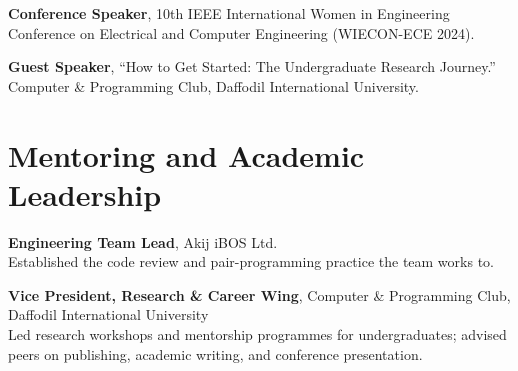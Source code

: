 \documentclass[a4paper,11pt]{article}
\let\origsection\section
\renewcommand{\section}[1]{\needspace{7\baselineskip}\origsection{#1}}
\newenvironment{datedlist}
  {\begin{list}{}{%
     \setlength{\leftmargin}{3.3cm}\setlength{\labelwidth}{2.9cm}
     \setlength{\labelsep}{0.4cm}\setlength{\itemsep}{5pt}
     \setlength{\parsep}{0pt}\setlength{\topsep}{4pt}
     \renewcommand{\makelabel}[1]{##1\hfill}}%
   \interlinepenalty=10000 }
  {\end{list}}
\begin{document}
\begin{datedlist}
\item[2024] \textbf{Conference Speaker}, 10th IEEE International Women in Engineering
  Conference on Electrical and Computer Engineering (WIECON-ECE 2024).

\item[2021] \textbf{Guest Speaker}, ``How to Get Started: The Undergraduate Research
  Journey.'' Computer \& Programming Club, Daffodil International University.
\end{datedlist}

\section{Mentoring and Academic Leadership}

\begin{datedlist}
\item[2024 -- Present] \textbf{Engineering Team Lead}, Akij iBOS Ltd.\\
  Established the code review and pair-programming practice the team works to.

\item[2021] \textbf{Vice President, Research \& Career Wing}, Computer \& Programming
  Club, Daffodil International University\\
  Led research workshops and mentorship programmes for undergraduates; advised peers on
  publishing, academic writing, and conference presentation.

\end{datedlist}
\end{document}
